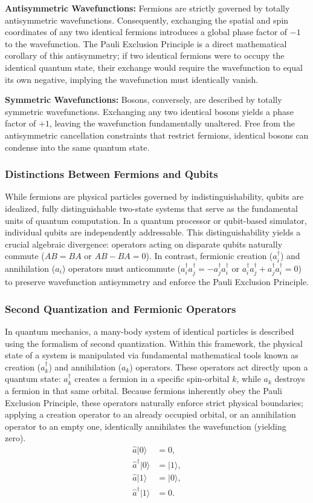 \textbf{Antisymmetric Wavefunctions:} Fermions are strictly governed by totally antisymmetric wavefunctions. Consequently, exchanging the spatial and spin coordinates of any two identical fermions introduces a global phase factor of $-1$ to the wavefunction. The Pauli Exclusion Principle is a direct mathematical corollary of this antisymmetry; if two identical fermions were to occupy the identical quantum state, their exchange would require the wavefunction to equal its own negative, implying the wavefunction must identically vanish.

\textbf{Symmetric Wavefunctions:} Bosons, conversely, are described by totally symmetric wavefunctions. Exchanging any two identical bosons yields a phase factor of $+1$, leaving the wavefunction fundamentally unaltered. Free from the antisymmetric cancellation constraints that restrict fermions, identical bosons can condense into the same quantum state.

\subsubsection{Distinctions Between Fermions and Qubits}
While fermions are physical particles governed by indistinguishability, qubits are idealized, fully distinguishable two-state systems that serve as the fundamental units of quantum computation. In a quantum processor or qubit-based simulator, individual qubits are independently addressable. This distinguishability yields a crucial algebraic divergence: operators acting on disparate qubits naturally commute ($AB = BA$ or $AB - BA = 0$). In contrast, fermionic creation ($a_i^\dagger$) and annihilation ($a_i$) operators must anticommute ($a_i^\dagger a_j^\dagger = -a_j^\dagger a_i^\dagger$ or $a_i^\dagger a_j^\dagger + a_j^\dagger a_i^\dagger = 0$) to preserve wavefunction antisymmetry and enforce the Pauli Exclusion Principle.

\subsubsection{Second Quantization and Fermionic Operators}
In quantum mechanics, a many-body system of identical particles is described using the formalism of second quantization. Within this framework, the physical state of a system is manipulated via fundamental mathematical tools known as creation ($a_k^\dagger$) and annihilation ($a_k$) operators. These operators act directly upon a quantum state: $a_k^\dagger$ creates a fermion in a specific spin-orbital $k$, while $a_k$ destroys a fermion in that same orbital. Because fermions inherently obey the Pauli Exclusion Principle, these operators naturally enforce strict physical boundaries; applying a creation operator to an already occupied orbital, or an annihilation operator to an empty one, identically annihilates the wavefunction (yielding zero).
\begin{align}
    \hat{a} |0\rangle &= 0, \\
    \hat{a}^\dagger |0\rangle &= |1\rangle, \\
    \hat{a} |1\rangle &= |0\rangle, \\
    \hat{a}^\dagger |1\rangle &= 0.
\end{align}

